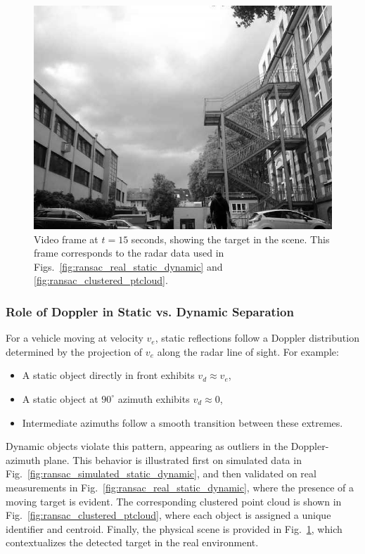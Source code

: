 \begin{figure}[!htbp]
    \centering
    \includegraphics[width=1.0\linewidth]{images/frame_15s.png}
    \caption{Video frame at $t=15$ seconds, showing the target in the scene. 
    This frame corresponds to the radar data used in Figs.~\ref{fig:ransac_real_static_dynamic} and \ref{fig:ransac_clustered_ptcloud}.}
    \label{fig:frame_15s_target}
\end{figure}

\subsubsection*{Role of Doppler in Static vs. Dynamic Separation}
For a vehicle moving at velocity $v_e$, static reflections follow a Doppler distribution determined by the projection of $v_e$ along the radar line of sight. 
For example:
\begin{itemize}
    \item A static object directly in front exhibits $v_d \approx v_e$,
    \item A static object at $90^\circ$ azimuth exhibits $v_d \approx 0$,
    \item Intermediate azimuths follow a smooth transition between these extremes.
\end{itemize}

Dynamic objects violate this pattern, appearing as outliers in the Doppler-azimuth plane. 
This behavior is illustrated first on simulated data in Fig.~\ref{fig:ransac_simulated_static_dynamic}, and then validated on real measurements in Fig.~\ref{fig:ransac_real_static_dynamic}, where the presence of a moving target is evident.  
The corresponding clustered point cloud is shown in Fig.~\ref{fig:ransac_clustered_ptcloud}, where each object is assigned a unique identifier and centroid. Finally, the physical scene is provided in Fig.~\ref{fig:frame_15s_target}, which contextualizes the detected target in the real environment.

